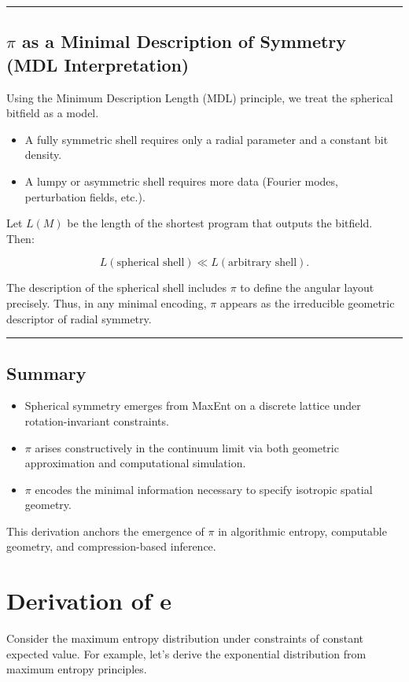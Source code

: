 \documentclass[12pt, a4paper]{article}
\begin{document}
\bigskip
\hrule
\bigskip

\subsection{$\pi$ as a Minimal Description of Symmetry (MDL Interpretation)}

Using the Minimum Description Length (MDL) principle, we treat the spherical bitfield as a model.

\begin{itemize}
  \item A fully symmetric shell requires only a radial parameter and a constant bit density.
  \item A lumpy or asymmetric shell requires more data (Fourier modes, perturbation fields, etc.).
\end{itemize}

Let $L(M)$ be the length of the shortest program that outputs the bitfield. Then:

\[
L(\text{spherical shell}) \ll L(\text{arbitrary shell}).
\]

The description of the spherical shell includes $\pi$ to define the angular layout precisely. Thus, in any minimal encoding, $\pi$ appears as the irreducible geometric descriptor of radial symmetry.

\bigskip
\hrule
\bigskip

\subsection{Summary}

\begin{itemize}
  \item Spherical symmetry emerges from MaxEnt on a discrete lattice under rotation-invariant constraints.
  \item $\pi$ arises constructively in the continuum limit via both geometric approximation and computational simulation.
  \item $\pi$ encodes the minimal information necessary to specify isotropic spatial geometry.
\end{itemize}

This derivation anchors the emergence of $\pi$ in algorithmic entropy, computable geometry, and compression-based inference.
\section{Derivation of e}
Consider the maximum entropy distribution under constraints of constant expected value. For example, let’s derive the exponential distribution from maximum entropy principles.
\end{document}
